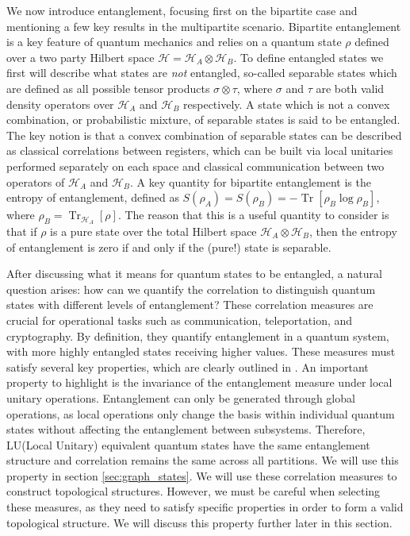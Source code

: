 \documentclass{article}
\DeclareMathOperator{\Tr}{Tr}
\newcommand{\brackets}[1]{\left[ #1 \right]}
\newcommand{\trace}[1]{\Tr \brackets{ #1 }}
\newcommand{\partrace}[2]{\Tr_{#1} \brackets{ #2 }}
\newcommand{\hilb}{\mathcal{H}}
\begin{document}
We now introduce entanglement, focusing first on the bipartite case and mentioning a few key results in the multipartite scenario. Bipartite entanglement is a key feature of quantum mechanics and relies on a quantum state $\rho$ defined over a two party Hilbert space $\hilb = \hilb_A \otimes \hilb_B$. To define entangled states we first will describe what states are \emph{not} entangled, so-called separable states which are defined as all possible tensor products $\sigma\otimes \tau$, where $\sigma$ and $\tau$ are both valid density operators over $\hilb_A$ and $\hilb_B$ respectively. A state which is not a convex combination, or probabilistic mixture, of separable states is said to be entangled. The key notion is that a convex combination of separable states can be described as classical correlations between registers, which can be built via local unitaries performed separately on each space and classical communication between two operators of $\hilb_A$ and $\hilb_B$. A key quantity for bipartite entanglement is the entropy of entanglement, defined as $S(\rho_A) = S(\rho_B) = -\trace{\rho_B \log \rho_B}$, where $\rho_B = \partrace{\hilb_A}{\rho}$. The reason that this is a useful quantity to consider is that if $\rho$ is a pure state over the total Hilbert space $\hilb_A \otimes \hilb_B$, then the entropy of entanglement is zero if and only if the (pure!) state is separable.

After discussing what it means for quantum states to be entangled, a natural question arises: how can we quantify the correlation to distinguish quantum states with different levels of entanglement? These correlation measures are crucial for operational tasks such as communication, teleportation, and cryptography. By definition, they quantify entanglement in a quantum system, with more highly entangled states receiving higher values. These measures must satisfy several key properties, which are clearly outlined in \cite{guhne2009entanglement}. An important property to highlight is the invariance of the entanglement measure under local unitary operations. Entanglement can only be generated through global operations, as local operations only change the basis within individual quantum states without affecting the entanglement between subsystems. Therefore, LU(Local Unitary) equivalent quantum states have the same entanglement structure and correlation remains the same across all partitions. We will use this property in section \ref{sec:graph_states}. We will use these correlation measures to construct topological structures. However, we must be careful when selecting these measures, as they need to satisfy specific properties in order to form a valid topological structure. We will discuss this property further later in this section.
\end{document}
